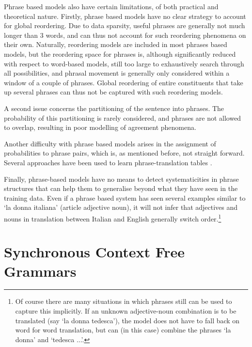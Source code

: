 Phrase based models also have certain limitations, of both practical and theoretical nature. Firstly, phrase based models have no clear strategy to account for global reordering. Due to data sparsity, useful phrases are generally not much longer than 3 words, and can thus not account for such reordering phenomena on their own. Naturally, reordering models are included in most phrases based models, but the reordering space for phrases is, although significantly reduced with respect to word-based models, still too large to exhaustively search through all possibilities, and phrasal movement is generally only considered within a window of a couple of phrases. Global reordering of entire constituents that take up several phrases can thus not be captured with such reordering models.

A second issue concerns the partitioning of the sentence into phrases. The probability of this partitioning is rarely considered, and phrases are not allowed to overlap, resulting in poor modelling of agreement phenomena. 

Another difficulty with phrase based models arises in the assignment of probabilities to phrase pairs, which is, as mentioned before, not straight forward. Several approaches have been used to learn phrase-translation tables \citep[see][p.130]{koehn2008statistical}. 

Finally, phrase-based models have no means to detect systematicities in phrase structures that can help them to generalise beyond what they have seen in the training data. Even if a phrase based system has seen several examples similar to `la donna italiana' (article adjective noun), it will not infer that adjectives and nouns in translation between Italian and English generally switch order.\footnote{Of course there are many situations in which phrases still can be used to capture this implicitly. If an unknown adjective-noun combination is to be translated (say `la donna tedesca'), the model does not have to fall back on word for word translation, but can (in this case) combine the phrases `la donna' and `tedesca ...'.}

\section{Synchronous Context Free Grammars}
\label{sec:SCFGs}

